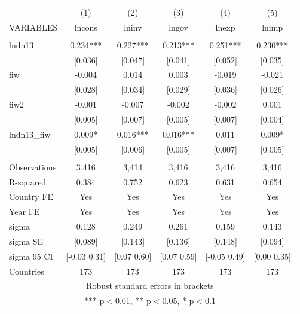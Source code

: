 \begin{tabular}{lccccc} \hline
 & (1) & (2) & (3) & (4) & (5) \\
VARIABLES & lncons & lninv & lngov & lnexp & lnimp \\ \hline
 &  &  &  &  &  \\
lndn13 & 0.234*** & 0.227*** & 0.213*** & 0.251*** & 0.230*** \\
 & [0.036] & [0.047] & [0.041] & [0.052] & [0.035] \\
fiw & -0.004 & 0.014 & 0.003 & -0.019 & -0.021 \\
 & [0.028] & [0.034] & [0.029] & [0.036] & [0.026] \\
fiw2 & -0.001 & -0.007 & -0.002 & -0.002 & 0.001 \\
 & [0.005] & [0.007] & [0.005] & [0.007] & [0.004] \\
lndn13\_fiw & 0.009* & 0.016*** & 0.016*** & 0.011 & 0.009* \\
 & [0.005] & [0.006] & [0.005] & [0.007] & [0.005] \\
 &  &  &  &  &  \\
Observations & 3,416 & 3,414 & 3,416 & 3,416 & 3,416 \\
R-squared & 0.384 & 0.752 & 0.623 & 0.631 & 0.654 \\
Country FE & Yes & Yes & Yes & Yes & Yes \\
Year FE & Yes & Yes & Yes & Yes & Yes \\
sigma & 0.128 & 0.249 & 0.261 & 0.159 & 0.143 \\
sigma SE & [0.089] & [0.143] & [0.136] & [0.148] & [0.094] \\
sigma 95 CI & [-0.03 0.31] & [0.07 0.60] & [0.07 0.59] & [-0.05 0.49] & [0.00 0.35] \\
 Countries & 173 & 173 & 173 & 173 & 173 \\ \hline
\multicolumn{6}{c}{ Robust standard errors in brackets} \\
\multicolumn{6}{c}{ *** p$<$0.01, ** p$<$0.05, * p$<$0.1} \\
\end{tabular}
